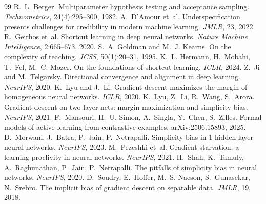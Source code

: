 \documentclass[11pt]{article}
\theoremstyle{definition}
\theoremstyle{remark}
\newcommand{\1}{\mathbf{1}}
\begin{document}
\begin{thebibliography}{99}\small
{} R.~L. Berger. Multiparameter hypothesis testing and acceptance sampling. \emph{Technometrics}, 24(4):295--300, 1982.
 A.~D'Amour et~al. Underspecification presents challenges for credibility in modern machine learning. \emph{JMLR}, 23, 2022.
 R.~Geirhos et~al. Shortcut learning in deep neural networks. \emph{Nature Machine Intelligence}, 2:665--673, 2020.
 S.~A. Goldman and M.~J. Kearns. On the complexity of teaching. \emph{JCSS}, 50(1):20--31, 1995.
 K.~L. Hermann, H.~Mobahi, T.~Fel, M.~C. Mozer. On the foundations of shortcut learning. \emph{ICLR}, 2024.
 Z.~Ji and M.~Telgarsky. Directional convergence and alignment in deep learning. \emph{NeurIPS}, 2020.
 K.~Lyu and J.~Li. Gradient descent maximizes the margin of homogeneous neural networks. \emph{ICLR}, 2020.
 K.~Lyu, Z.~Li, R.~Wang, S.~Arora. Gradient descent on two-layer nets: margin maximization and simplicity bias. \emph{NeurIPS}, 2021.
 F.~Mansouri, H.~U. Simon, A.~Singla, Y.~Chen, S.~Zilles. Formal models of active learning from contrastive examples. arXiv:2506.15893, 2025.
 D.~Morwani, J.~Batra, P.~Jain, P.~Netrapalli. Simplicity bias in 1-hidden layer neural networks. \emph{NeurIPS}, 2023.
 M.~Pezeshki et~al. Gradient starvation: a learning proclivity in neural networks. \emph{NeurIPS}, 2021.
 H.~Shah, K.~Tamuly, A.~Raghunathan, P.~Jain, P.~Netrapalli. The pitfalls of simplicity bias in neural networks. \emph{NeurIPS}, 2020.
 D.~Soudry, E.~Hoffer, M.~S. Nacson, S.~Gunasekar, N.~Srebro. The implicit bias of gradient descent on separable data. \emph{JMLR}, 19, 2018.
\end{thebibliography}
\end{document}
